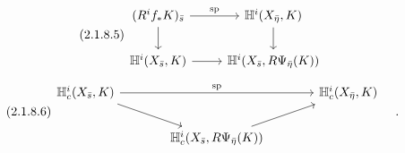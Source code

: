 \begin{equation}\tag{2.1.8.5}
\begin{tikzcd}
(R^i f_* K)_{\bar{s}} \arrow[r, "\mathrm{sp}"] \arrow[d] & \mathbb{H}^i(X_{\bar{\eta}}, K) \arrow[d] \\
\mathbb{H}^i(X_{\bar{s}}, K) \arrow[r] & \mathbb{H}^i(X_{\bar{s}}, R\Psi_{\bar{\eta}}(K))
\end{tikzcd}
\end{equation}
\begin{equation}\tag{2.1.8.6}
\begin{tikzcd}[column sep=large]
\mathbb{H}^i_c(X_{\bar{s}},K) \arrow[rr, "\mathrm{sp}"] \arrow[dr] & {} & \mathbb{H}^i_c(X_{\bar{\eta}}, K) \\
{} & \mathbb{H}^i_c(X_{\bar{s}}, R\Psi_{\bar{\eta}}(K)) \arrow[ur] &
{} \end{tikzcd}\quad .
\end{equation}
